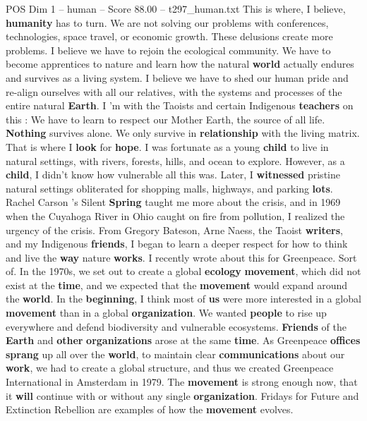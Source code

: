 \begin{textsample}{POS Dim 1 – human – Score 88.00 – t297\_human.txt}
This is where, I believe, \textbf{humanity} has to turn.
We are not solving our problems with conferences, technologies, space travel, or economic growth.
These delusions create more problems.
I believe we have to rejoin the ecological community.
We have to become apprentices to nature and learn how the natural \textbf{world} actually endures and survives as a living system.
I believe we have to shed our human pride and re-align ourselves with all our relatives, with the systems and processes of the entire natural \textbf{Earth}.
I ’m with the Taoists and certain Indigenous \textbf{teachers} on this : We have to learn to respect our Mother Earth, the source of all life. \textbf{Nothing} survives alone.
We only survive in \textbf{relationship} with the living matrix.
That is where I \textbf{look} for \textbf{hope}.
I was fortunate as a young \textbf{child} to live in natural settings, with rivers, forests, hills, and ocean to explore.
However, as a \textbf{child}, I didn't know how vulnerable all this was.
Later, I \textbf{witnessed} pristine natural settings obliterated for shopping malls, highways, and parking \textbf{lots}.
Rachel Carson ’s Silent \textbf{Spring} taught me more about the crisis, and in 1969 when the Cuyahoga River in Ohio caught on fire from pollution, I realized the urgency of the crisis.
From Gregory Bateson, Arne Naess, the Taoist \textbf{writers}, and my Indigenous \textbf{friends}, I began to learn a deeper respect for how to think and live the \textbf{way} nature \textbf{works}.
I recently wrote about this for Greenpeace.
Sort of.
In the 1970s, we set out to create a global \textbf{ecology} \textbf{movement}, which did not exist at the \textbf{time}, and we expected that the \textbf{movement} would expand around the \textbf{world}.
In the \textbf{beginning}, I think most of \textbf{us} were more interested in a global \textbf{movement} than in a global \textbf{organization}.
We wanted \textbf{people} to rise up everywhere and defend biodiversity and vulnerable ecosystems. \textbf{Friends} of the \textbf{Earth} and \textbf{other} \textbf{organizations} arose at the same \textbf{time}.
As Greenpeace \textbf{offices} \textbf{sprang} up all over the \textbf{world}, to maintain clear \textbf{communications} about our \textbf{work}, we had to create a global structure, and thus we created Greenpeace International in Amsterdam in 1979.
The \textbf{movement} is strong enough now, that it \textbf{will} continue with or without any single \textbf{organization}.
Fridays for Future and Extinction Rebellion are examples of how the \textbf{movement} evolves.

\end{textsample}

